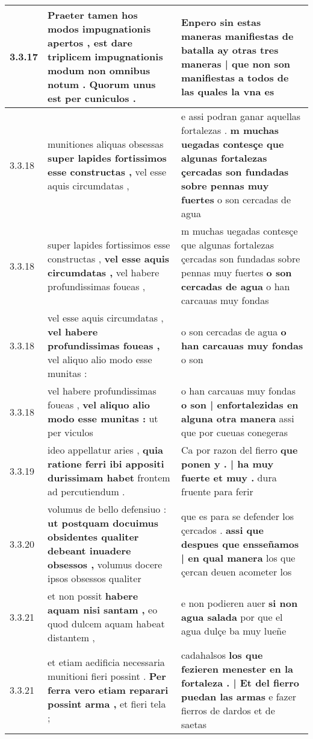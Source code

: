 \begin{tabular}{|p{1cm}|p{6.5cm}|p{6.5cm}|}
3.3.17 & Praeter tamen hos modos impugnationis apertos , \textbf{ est dare triplicem impugnationis modum non omnibus notum . } Quorum unus est per cuniculos . & Enpero sin estas maneras manifiestas de batalla \textbf{ ay otras tres maneras | que non son manifiestas a todos } de las quales la vna es \\\hline
3.3.18 & munitiones aliquas obsessas \textbf{ super lapides fortissimos esse constructas , } vel esse aquis circumdatas , & e assi podran ganar aquellas fortalezas . \textbf{ m muchas uegadas contesçe que algunas fortalezas çercadas son fundadas sobre pennas muy fuertes } o son cercadas de agua \\\hline
3.3.18 & super lapides fortissimos esse constructas , \textbf{ vel esse aquis circumdatas , } vel habere profundissimas foueas , & m muchas uegadas contesçe que algunas fortalezas çercadas son fundadas sobre pennas muy fuertes \textbf{ o son cercadas de agua } o han carcauas muy fondas \\\hline
3.3.18 & vel esse aquis circumdatas , \textbf{ vel habere profundissimas foueas , } vel aliquo alio modo esse munitas : & o son cercadas de agua \textbf{ o han carcauas muy fondas } o son \\\hline
3.3.18 & vel habere profundissimas foueas , \textbf{ vel aliquo alio modo esse munitas : } ut per viculos & o han carcauas muy fondas \textbf{ o son | enfortalezidas en alguna otra manera } assi que por cueuas conegeras \\\hline
3.3.19 & ideo appellatur aries , \textbf{ quia ratione ferri ibi appositi durissimam habet } frontem ad percutiendum . & Ca por razon del fierro \textbf{ que ponen y . | ha muy fuerte et muy . } dura fruente para ferir \\\hline
3.3.20 & volumus de bello defensiuo : \textbf{ ut postquam docuimus obsidentes qualiter debeant inuadere obsessos , } volumus docere ipsos obsessos qualiter & que es para se defender los çercados . \textbf{ assi que despues que ensseñamos | en qual manera } los que çercan deuen acometer los \\\hline
3.3.21 & et non possit \textbf{ habere aquam nisi santam , } eo quod dulcem aquam habeat distantem , & e non podieren auer \textbf{ si non agua salada } por que el agua dulçe ba muy lueñe \\\hline
3.3.21 & et etiam aedificia necessaria munitioni fieri possint . \textbf{ Per ferra vero etiam reparari possint arma , } et fieri tela ; & cadahalsos \textbf{ los que fezieren menester en la fortaleza . | Et del fierro puedan las armas } e fazer fierros de dardos et de saetas \\\hline

\end{tabular}
